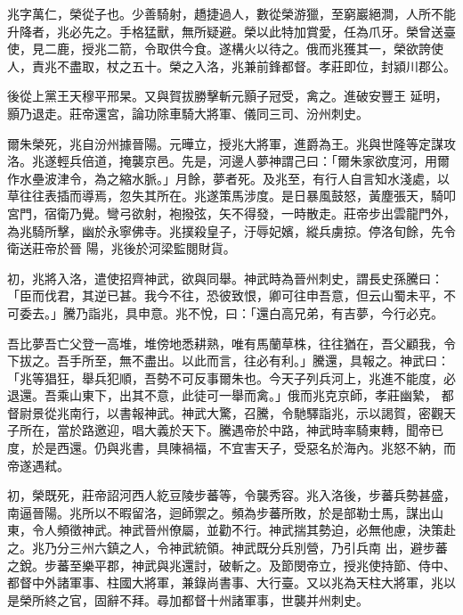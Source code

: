 \begin{pinyinscope}
 兆字萬仁，榮從子也。少善騎射，趫捷過人，數從榮游獵，至窮巖絕澗，人所不能升降者，兆必先之。手格猛獸，無所疑避。榮以此特加賞愛，任為爪牙。榮曾送臺使，見二鹿，授兆二箭，令取供今食。遂構火以待之。俄而兆獲其一，榮欲誇使人，責兆不盡取，杖之五十。榮之入洛，兆兼前鋒都督。孝莊即位，封潁川郡公。



 後從上黨王天穆平邢杲。又與賀拔勝擊斬元顥子冠受，禽之。進破安豐王
 延明，顥乃退走。莊帝還宮，論功除車騎大將軍、儀同三司、汾州刺史。



 爾朱榮死，兆自汾州據晉陽。元曄立，授兆大將軍，進爵為王。兆與世隆等定謀攻洛。兆遂輕兵倍道，掩襲京邑。先是，河邊人夢神謂己曰：「爾朱家欲度河，用爾作水壘波津令，為之縮水脈。」月餘，夢者死。及兆至，有行人自言知水淺處，以草往往表插而導焉，忽失其所在。兆遂策馬涉度。是日暴風鼓怒，黃塵張天，騎叩宮門，宿衛乃覺。彎弓欲射，袍撥弦，矢不得發，一時散走。莊帝步出雲龍門外，為兆騎所擊，幽於永寧佛寺。兆撲殺皇子，汙辱妃嬪，縱兵虜掠。停洛旬餘，先令衛送莊帝於晉
 陽，兆後於河梁監閱財貨。



 初，兆將入洛，遣使招齊神武，欲與同舉。神武時為晉州刺史，謂長史孫騰曰：「臣而伐君，其逆已甚。我今不往，恐彼致恨，卿可往申吾意，但云山蜀未平，不可委去。」騰乃詣兆，具申意。兆不悅，曰：「還白高兄弟，有吉夢，今行必克。



 吾比夢吾亡父登一高堆，堆傍地悉耕熟，唯有馬蘭草株，往往猶在，吾父顧我，令下拔之。吾手所至，無不盡出。以此而言，往必有利。」騰還，具報之。神武曰：「兆等猖狂，舉兵犯順，吾勢不可反事爾朱也。今天子列兵河上，兆進不能度，必退還。吾乘山東下，出其不意，此徒可一舉而禽。」俄而兆克京師，孝莊幽縶，
 都督尉景從兆南行，以書報神武。神武大驚，召騰，令馳驛詣兆，示以謁賀，密觀天子所在，當於路邀迎，唱大義於天下。騰遇帝於中路，神武時率騎東轉，聞帝已度，於是西還。仍與兆書，具陳禍福，不宜害天子，受惡名於海內。兆怒不納，而帝遂遇弒。



 初，榮既死，莊帝詔河西人紇豆陵步蕃等，令襲秀容。兆入洛後，步蕃兵勢甚盛，南逼晉陽。兆所以不暇留洛，迴師禦之。頻為步蕃所敗，於是部勒士馬，謀出山東，令人頻徵神武。神武晉州僚屬，並勸不行。神武揣其勢迫，必無他慮，決策赴之。兆乃分三州六鎮之人，令神武統領。神武既分兵別營，乃引兵南
 出，避步蕃之銳。步蕃至樂平郡，神武與兆還討，破斬之。及節閔帝立，授兆使持節、侍中、都督中外諸軍事、柱國大將軍，兼錄尚書事、大行臺。又以兆為天柱大將軍，兆以是榮所終之官，固辭不拜。尋加都督十州諸軍事，世襲并州刺史。




\end{pinyinscope}
